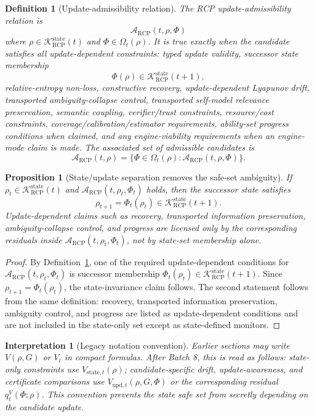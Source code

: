 \documentclass[11pt]{article}
\newtheorem{proposition}[theorem]{Proposition}
\newtheorem{definition}[theorem]{Definition}
\newtheorem{interpretation}[theorem]{Interpretation}
\newcommand{\K}{\mathcal{K}}
\newcommand{\Acal}{\mathcal{A}}
\newcommand{\1}{\mathbf{1}}
\newcommand{\RCP}{\mathrm{RCP}}
\newcommand{\state}{\mathrm{state}}
\providecommand{\upd}{\mathrm{upd}}
\begin{document}
\begin{definition}[Update-admissibility relation]
\label{def:update_admissibility_relation_batch8}
The RCP update-admissibility relation is
\[
\Acal_{\RCP}(t,\rho,\Phi)
\]
where \(\rho\in\K_{\RCP}^{\state}(t)\) and \(\Phi\in\Omega_t(\rho)\). It is true exactly when the candidate satisfies all update-dependent constraints: typed update validity, successor state membership
\[
\Phi(\rho)\in\K_{\RCP}^{\state}(t+1),
\]
relative-entropy non-loss, constructive recovery, update-dependent Lyapunov drift, transported ambiguity-collapse control, transported self-model relevance preservation, semantic coupling, verifier/trust constraints, resource/cost constraints, coverage/calibration/estimator requirements, ability-set progress conditions when claimed, and any engine-viability requirements when an engine-mode claim is made. The associated set of admissible candidates is
\[
\Acal_{\RCP}(t,\rho)=\{\Phi\in\Omega_t(\rho):\Acal_{\RCP}(t,\rho,\Phi)\}.
\]
\end{definition}

\begin{proposition}[State/update separation removes the safe-set ambiguity]
\label{prop:state_update_separation_removes_ambiguity}
If \(\rho_t\in\K_{\RCP}^{\state}(t)\) and \(\Acal_{\RCP}(t,\rho_t,\Phi_t)\) holds, then the successor state satisfies
\[
\rho_{t+1}=\Phi_t(\rho_t)\in\K_{\RCP}^{\state}(t+1).
\]
Update-dependent claims such as recovery, transported information preservation, ambiguity-collapse control, and progress are licensed only by the corresponding residuals inside \(\Acal_{\RCP}(t,\rho_t,\Phi_t)\), not by state-set membership alone.
\end{proposition}

\begin{proof}
By Definition~\ref{def:update_admissibility_relation_batch8}, one of the required update-dependent conditions for \(\Acal_{\RCP}(t,\rho_t,\Phi_t)\) is successor membership \(\Phi_t(\rho_t)\in\K_{\RCP}^{\state}(t+1)\). Since \(\rho_{t+1}=\Phi_t(\rho_t)\), the state-invariance claim follows. The second statement follows from the same definition: recovery, transported information preservation, ambiguity control, and progress are listed as update-dependent conditions and are not included in the state-only set except as state-defined monitors.
\end{proof}

\begin{interpretation}[Legacy notation convention]
Earlier sections may write \(V(\rho,G)\) or \(V_t\) in compact formulas. After Batch 8, this is read as follows: state-only constraints use \(V_{\state,t}(\rho)\); candidate-specific drift, update-awareness, and certificate comparisons use \(V_{\upd,t}(\rho,G,\Phi)\) or the corresponding residual \(q_t^V(\Phi;\rho)\). This convention prevents the state safe set from secretly depending on the candidate update.
\end{interpretation}
\end{document}
